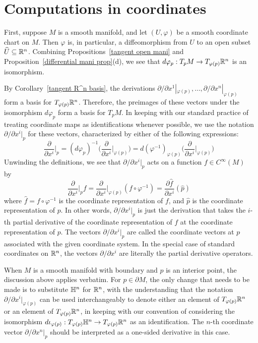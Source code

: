\section{Computations in coordinates}
First, suppose $M$ is a smooth manifold, and let $(U,\varphi)$ be a smooth coordinate chart on $M$. Then $\varphi$ is, in particular, a diffeomorphism from $U$ to an open subset $\widehat{U}\subseteq\mathbb{R}^n$. Combining Propositions~\ref{tangent open mani} and Proposition~\ref{differential mani prop}(d), we see that $d\varphi_p:T_pM\to T_{\varphi(p)}\mathbb{R}^n$ is an isomorphism.\par
By Corollary~\ref{tangent R^n basis}, the derivations $\partial/\partial x^1|_{\varphi(p)},\dots,\partial/\partial x^n|_{\varphi(p)}$ form a basis for $T_{\varphi(p)}\mathbb{R}^n$. Therefore, the preimages of these vectors under the isomorphism $d\varphi_p$ form a basis for $T_pM$. In keeping with our standard practice of treating coordinate maps as identifications whenever possible, we use the notation $\partial/\partial x^i|_p$ for these vectors, characterized by either of the following expressions:
\[\frac{\partial}{\partial x^i}\Big|_p=(d\varphi_p)^{-1}\Big(\frac{\partial}{\partial x^i}\Big|_{\varphi(p)}\Big)=d(\varphi^{-1})_{\varphi(p)}\Big(\frac{\partial}{\partial x^i}\Big|_{\varphi(p)}\Big)\]
Unwinding the definitions, we see that $\partial/\partial x^i|_p$ acts on a function $f\in C^\infty(M)$ by
\[\frac{\partial}{\partial x^i}\Big|_pf=\frac{\partial }{\partial x^i}\Big|_{\varphi(p)}(f\circ\varphi^{-1})=\frac{\partial\widehat{f}}{\partial x^i}(\widehat{p})\]
where $\widehat{f}=f\circ\varphi^{-1}$ is the coordinate representation of $f$, and $\widehat{p}$ is the coordinate representation of $p$. In other words, $\partial/\partial x^i|_p$ is just the derivation that takes the $i$-th partial derivative of the coordinate representation of $f$ at the coordinate representation of $p$. The vectors $\partial/\partial x^i|_p$ are called the coordinate vectors at $p$ associated with the given coordinate system. In the special case of standard coordinates on $\mathbb{R}^n$, the vectors $\partial/\partial x^i$ are literally the partial derivative operators.\par
When $M$ is a smooth manifold with boundary and $p$ is an interior point, the discussion above applies verbatim. For $p\in\partial M$, the only change that needs to be made is to substitute $\mathbb{H}^n$ for $\mathbb{R}^n$, with the understanding that the notation $\partial/\partial x^i|_{\varphi(p)}$ can be used interchangeably to denote either an element of $T_{\varphi(p)}\mathbb{R}^n$ or an element of $T_{\varphi(p)}\mathbb{R}^n$, in keeping with our convention of considering the isomorphism $d\iota_{\varphi(p)}:T_{\varphi(p)}\mathbb{H}^n\to T_{\varphi(p)}\mathbb{R}^n$ as an identification. The $n$-th coordinate vector $\partial/\partial x^n|_p$ should be interpreted as a one-sided derivative in this case.\par

